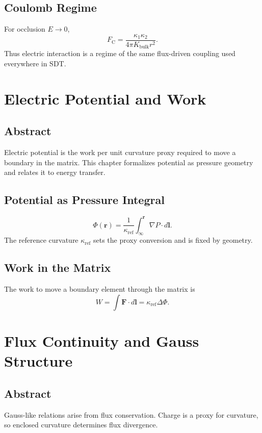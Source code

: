 \documentclass[12pt]{book}
\begin{document}
\section{Coulomb Regime}
For occlusion $E \to 0$,
\begin{equation}
F_{\text{C}} = \frac{\kappa_1 \kappa_2}{4\pi K_{\text{bulk}} r^2}.
\end{equation}
Thus electric interaction is a regime of the same flux-driven coupling used everywhere in SDT.

\chapter{Electric Potential and Work}

\section*{Abstract}
Electric potential is the work per unit curvature proxy required to move a boundary in the matrix. This
chapter formalizes potential as pressure geometry and relates it to energy transfer.

\section{Potential as Pressure Integral}
\begin{equation}
\Phi(\mathbf{r}) = \frac{1}{\kappa_{\text{ref}}}\int_{\infty}^{\mathbf{r}} \nabla P \cdot d\mathbf{l}.
\end{equation}
The reference curvature $\kappa_{\text{ref}}$ sets the proxy conversion and is fixed by geometry.

\section{Work in the Matrix}
The work to move a boundary element through the matrix is
\begin{equation}
W = \int \mathbf{F}\cdot d\mathbf{l} = \kappa_{\text{ref}} \Delta \Phi.
\end{equation}

\chapter{Flux Continuity and Gauss Structure}

\section*{Abstract}
Gauss-like relations arise from flux conservation. Charge is a proxy for curvature, so enclosed curvature
determines flux divergence.
\end{document}
